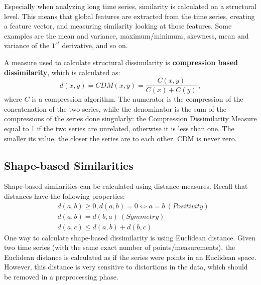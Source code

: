Especially when analyzing long time series, similarity is calculated on a structural level. This means that global features are extracted from the time series, creating a feature vector, and measuring similarity looking at those features. Some examples are the mean and variance, maximum/minimum, skewness, mean and variance of the $1^{st}$ derivative, and so on.

A measure used to calculate structural dissimilarity is \textbf{compression based dissimilarity}, which is calculated as:
\begin{equation*}
    d(x,y) = CDM(x,y) = \dfrac{C(x,y)}{C(x) + C(y)} \,,
\end{equation*}
where $C$ is a compression algorithm. The numerator is the compression of the concatenation of the two series, while the denominator is the sum of the compressions of the series done singularly: the Compression Dissimilarity Measure equal to 1 if the two series are unrelated, otherwise it is less than one. The smaller its value, the closer the series are to each other. CDM is never zero.

\subsection{Shape-based Similarities}

Shape-based similarities can be calculated using distance measures. Recall that distances have the following properties:
\begin{align*}
    &d(a,b) \geq 0, d(a,b) = 0 \iff a = b \ (Positivity) \\
    &d(a,b) = d(b,a) \ (Symmetry) \\
    &d(a,c) \leq d(a,b) + d(b,c)
\end{align*}
One way to calculate shape-based dissimilarity is using Euclidean distance. Given two time series (with the same exact number of points/measurements), the Euclidean distance is calculated as if the series were points in an Euclidean space. However, this distance is very sensitive to distortions in the data, which should be removed in a preprocessing phase.

